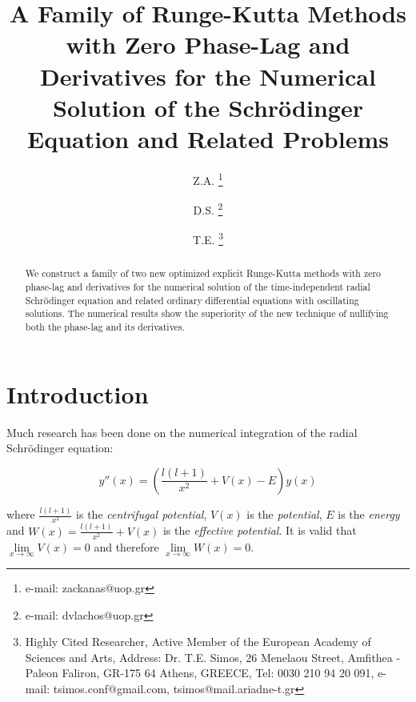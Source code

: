 \documentclass[numreferences]{kluwer}
\begin{document}
\begin{article}
\begin{opening}

\title
{A Family of Runge-Kutta Methods with Zero Phase-Lag and Derivatives for the Numerical Solution of
the Schr\"{o}dinger Equation and Related Problems}

\author{Z.A. \thanks{e-mail: zackanas@uop.gr}}
\author{D.S. \thanks{e-mail: dvlachos@uop.gr}}
\author{T.E. \thanks{Highly Cited Researcher, Active Member of the European Academy of Sciences and Arts, Address: Dr. T.E. Simos, 26 Menelaou Street, Amfithea - Paleon Faliron, GR-175 64 Athens, GREECE, Tel: 0030 210 94 20 091, e-mail: tsimos.conf@gmail.com, tsimos@mail.ariadne-t.gr}}


\begin{abstract}
We construct a family of two new optimized explicit Runge-Kutta methods with zero phase-lag and derivatives for the numerical solution of the time-independent radial Schr\"odinger equation and related ordinary differential equations with oscillating solutions. The numerical results show the superiority of the new technique of nullifying both the phase-lag and its derivatives.
\end{abstract}


\end{opening}

\section{Introduction}
\label{Intro}

Much research has been done on the numerical integration of the radial Schr\"{o}dinger equation:

\begin{equation}
\label{Schrodinger}
    y''(x) = \left( \frac{l(l+1)}{x^{2}}+V(x)-E \right) y(x)
\end{equation}

\noindent where $\frac{l(l+1)}{x^{2}}$ is the \textit{centrifugal potential}, $V(x)$ is the \textit{potential}, $E$ is
the \textit{energy} and $W(x) = \frac{l(l+1)}{x^{2}} + V(x)$ is the \textit{effective potential}. It is valid that
${\mathop {\lim} \limits_{x \to \infty}} V(x) = 0$ and therefore ${\mathop {\lim} \limits_{x \to \infty}} W(x) = 0$.


\end{article}
\end{document}
